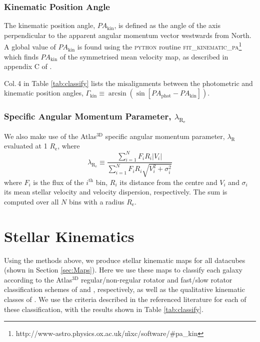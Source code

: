 \documentclass[a4paper,fleqn,usenatbib]{mnras}
\begin{document}
		\subsubsection{Kinematic Position Angle}
			The kinematic position angle, $PA_\text{kin}$, is defined as the angle of the axis perpendicular to the apparent angular momentum vector westwards from North. A global value of $PA_\text{kin}$ is found using the \textsc{python} routine \textsc{fit\_kinematic\_pa}\footnote{http://www-astro.physics.ox.ac.uk/\~mxc/software/\#pa\_kin} which finds $PA_\text{kin}$ of the symmetrised mean velocity map, as described in appendix C of \citet{Krajnovic2006}. %

			Col.\,4 in Table \ref{tab:classify} lists the misalignments between the photometric and kinematic position angles, $\Gamma_\text{kin} \equiv \arcsin(\sin[PA_\text{phot} - PA_\text{kin}])$.

		\subsubsection{Specific Angular Momentum Parameter, $\lambda_\mathrm{R_e}$}
			We also make use of the Atlas$^\text{3D}$ specific angular momentum parameter, $\lambda_\text{R}$ \citep{Emsellem2007} evaluated at 1 $R_\text{e}$, where 
			\begin{equation}
				\lambda_\mathrm{R_e} \equiv \frac{\sum_{i=1}^{N} F_i R_i |V_i|}{\sum_{i=1}^{N} F_i R_i \sqrt{V_i^2 + \sigma_i^2}}
			\end{equation}
			where $F_i$ is the flux of the $i^\text{th}$ bin, $R_i$ its distance from the centre and $V_i$ and $\sigma_i$ its mean stellar velocity and velocity dispersion, respectively. The sum is computed over all $N$ bins with a radius $R_\text{e}$.

\section{Stellar Kinematics}
	\label{sec:StarKine}
	Using the methods above, we produce stellar kinematic maps for all datacubes (shown in Section \ref{sec:Maps}). Here we use these maps to classify each galaxy according to the Atlas$^\text{3D}$ regular/non-regular rotator and fast/slow rotator classification schemes of \citet{Krajnovic2006} and \citet{Cappellari2016}, respectively, as well as the qualitative kinematic classes of \citet{Krajnovic2011}. We use the criteria described in the referenced literature for each of these classification, with the results shown in Table \ref{tab:classify}.
\end{document}
